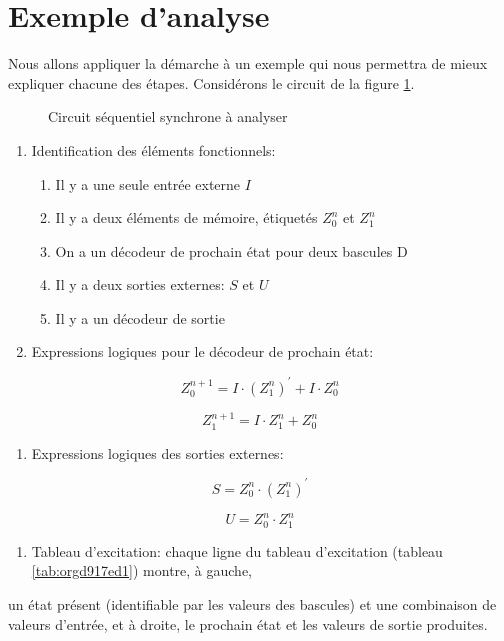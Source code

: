 \documentclass[letter, oneside]{book}
\begin{document}
\section{Exemple d'analyse}
\label{sec:orgb476a99}

Nous allons appliquer la démarche à un exemple qui nous permettra de
mieux expliquer chacune des étapes. Considérons le circuit de la
figure \ref{fig:org5789917}.

\begin{figure}[htbp]
\centering

\caption{\label{fig:org5789917}Circuit séquentiel synchrone à analyser}
\end{figure}

\begin{enumerate}
\item Identification des éléments fonctionnels:

\begin{enumerate}
\item Il y a une seule entrée externe \(I\)
\item Il y a deux éléments de mémoire, étiquetés \(Z_0^n\) et  \(Z_1^n\)
\item On a un décodeur de prochain état pour deux bascules D
\item Il y a deux sorties externes: \(S\) et \(U\)
\item Il y a un décodeur de sortie
\end{enumerate}

\item Expressions logiques pour le décodeur de prochain état:
\end{enumerate}
$$Z_0^{n+1} = I \cdot (Z_1^n)^\prime + I \cdot Z_0^n$$

$$Z_1^{n+1} = I \cdot Z_1^n + Z_0^n$$

\begin{enumerate}
\item Expressions logiques des sorties externes:
\end{enumerate}
$$S =  Z_0^n \cdot (Z_1^{n})^\prime$$

$$U =  Z_0^n \cdot Z_1^{n}$$

\begin{enumerate}
\item Tableau d'excitation: chaque ligne du tableau d'excitation (tableau \ref{tab:orgd917ed1}) montre, à gauche,
\end{enumerate}
un état présent (identifiable par les valeurs des bascules) et une
combinaison de valeurs d'entrée, et à droite, le prochain état et les
valeurs de sortie produites.
\end{document}
